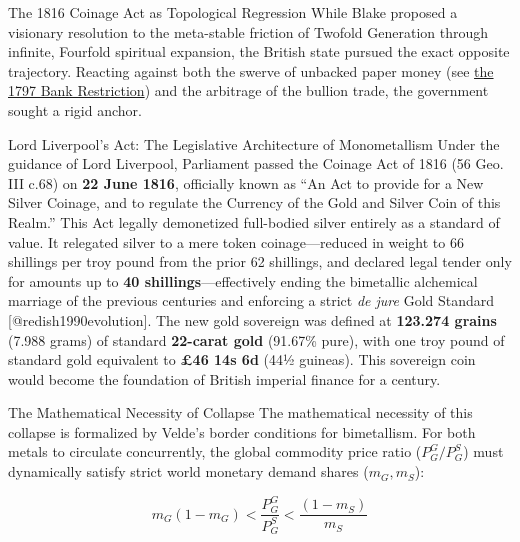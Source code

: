 \documentclass[
  ignorenonframetext,
]{beamer}
\author{\texorpdfstring{}{}}
\date{}
\begin{document}
\begin{frame}{The 1816 Coinage Act as Topological Regression}
\protect{}\label{the-1816-coinage-act-as-topological-regression}
While Blake proposed a visionary resolution to the meta-stable friction
of Twofold Generation through infinite, Fourfold spiritual expansion,
the British state pursued the exact opposite trajectory. Reacting
against both the swerve of unbacked paper money (see
\href{02c_bank_restriction_1797.md\#the-1797-bank-restriction-and-the-suspension-of-metallic-reality}{the
1797 Bank Restriction}) and the arbitrage of the bullion trade, the
government sought a rigid anchor.

\begin{block}{Lord Liverpool's Act: The Legislative Architecture of
Monometallism}
\protect{}\label{lord-liverpools-act-the-legislative-architecture-of-monometallism}
Under the guidance of Lord Liverpool, Parliament passed the Coinage Act
of 1816 (56 Geo. III c.68) on \textbf{22 June 1816}, officially known as
``An Act to provide for a New Silver Coinage, and to regulate the
Currency of the Gold and Silver Coin of this Realm.'' This Act legally
demonetized full-bodied silver entirely as a standard of value. It
relegated silver to a mere token coinage---reduced in weight to 66
shillings per troy pound from the prior 62 shillings, and declared legal
tender only for amounts up to \textbf{40 shillings}---effectively ending
the bimetallic alchemical marriage of the previous centuries and
enforcing a strict \emph{de jure} Gold Standard
{[}@redish1990evolution{]}. The new gold sovereign was defined at
\textbf{123.274 grains} (7.988 grams) of standard \textbf{22-carat gold}
(91.67\% pure), with one troy pound of standard gold equivalent to
\textbf{£46 14s 6d} (44½ guineas). This sovereign coin would become the
foundation of British imperial finance for a century.
\end{block}

\begin{block}{The Mathematical Necessity of Collapse}
\protect{}\label{the-mathematical-necessity-of-collapse}
The mathematical necessity of this collapse is formalized by Velde's
border conditions for bimetallism. For both metals to circulate
concurrently, the global commodity price ratio (\(P_G^G / P_G^S\)) must
dynamically satisfy strict world monetary demand shares (\(m_G, m_S\)):

\begin{equation}
\label{eq:velde_demand_shares}
m_G (1 - m_G) < \frac{P_G^G}{P_G^S} < \frac{(1 - m_S)}{m_S}
\end{equation}


\end{block}
\end{frame}
\end{document}
